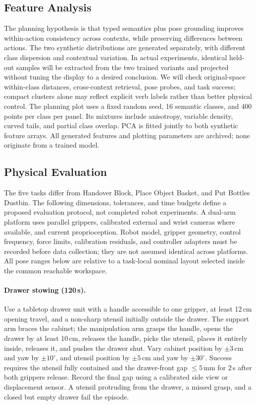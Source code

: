 \subsection{Feature Analysis}
The planning hypothesis is that typed semantics plus pose grounding improves within-action consistency across contexts, while preserving differences between actions. The two synthetic distributions are generated separately, with different class dispersion and contextual variation. In actual experiments, identical held-out samples will be extracted from the two trained variants and projected without tuning the display to a desired conclusion. We will check original-space within-class distances, cross-context retrieval, pose probes, and task success; compact clusters alone may reflect explicit verb labels rather than better physical control.
The planning plot uses a fixed random seed, 16 semantic classes, and 400 points per class per panel. Its mixtures include anisotropy, variable density, curved tails, and partial class overlap. PCA is fitted jointly to both synthetic feature arrays. All generated features and plotting parameters are archived; none originate from a trained model.
\subsection{Physical Evaluation}
\label{app:realrobot}
The five tasks differ from Handover Block, Place Object Basket, and Put Bottles Dustbin. The following dimensions, tolerances, and time budgets define a proposed evaluation protocol, not completed robot experiments. A dual-arm platform uses parallel grippers, calibrated external and wrist cameras where available, and current proprioception. Robot model, gripper geometry, control frequency, force limits, calibration residuals, and controller adapters must be recorded before data collection; they are not assumed identical across platforms. All pose ranges below are relative to a task-local nominal layout selected inside the common reachable workspace.

\paragraph{Drawer stowing (120\,s).}
Use a tabletop drawer unit with a handle accessible to one gripper, at least 12\,cm opening travel, and a non-sharp utensil initially outside the drawer. The support arm braces the cabinet; the manipulation arm grasps the handle, opens the drawer by at least 10\,cm, releases the handle, picks the utensil, places it entirely inside, releases it, and pushes the drawer shut. Vary cabinet position by $\pm3$\,cm and yaw by $\pm10^\circ$, and utensil position by $\pm5$\,cm and yaw by $\pm30^\circ$. Success requires the utensil fully contained and the drawer-front gap $\leq5$\,mm for 2\,s after both grippers release. Record the final gap using a calibrated side view or displacement sensor. A utensil protruding from the drawer, a missed grasp, and a closed but empty drawer fail the episode.

